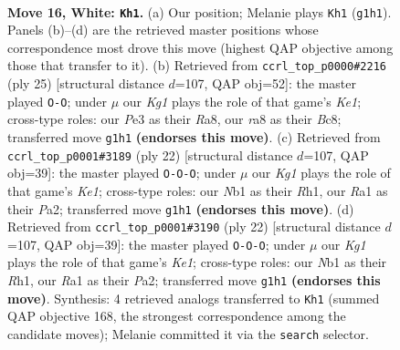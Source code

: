 \documentclass[11pt]{article}
\begin{document}
\clearpage

\begin{figure}[p]\centering
\begin{subfigure}{0.46\textwidth}\centering
\resizebox{\linewidth}{!}{%
\newchessgame
\chessboard[
  setfen={r1b2r1k/1p1n1p2/4pnp1/2b4p/p1N2B2/P3P1P1/1P3PBP/RN1R2K1 w - - 1 16},
  showmover=false,
  pgfstyle=straightmove, color=movearrow, markmove={g1-h1}
]}
\caption{}
\end{subfigure}\hfill
\begin{subfigure}{0.46\textwidth}\centering
\resizebox{\linewidth}{!}{%
\newchessgame
\chessboard[
  setfen={r1b1k2r/3n1pp1/pp2p2p/2bn4/P1N5/2P2N2/1P1BBPPP/R3K2R b KQkq - 1 13},
  showmover=false,
  pgfstyle=straightmove, color=movearrow, markmove={e8-g8}
]}
\caption{}
\end{subfigure}
\\[4pt]
\begin{subfigure}{0.46\textwidth}\centering
\resizebox{\linewidth}{!}{%
\newchessgame
\chessboard[
  setfen={rn5r/p3kppp/bp3n2/2pp4/3P4/1PN2NP1/P3PP1P/R3KB1R w KQ - 0 12},
  showmover=false,
  pgfstyle=straightmove, color=movearrow, markmove={e1-c1}
]}
\caption{}
\end{subfigure}\hfill
\begin{subfigure}{0.46\textwidth}\centering
\resizebox{\linewidth}{!}{%
\newchessgame
\chessboard[
  setfen={rn5r/p3kppp/bp3n2/2pp4/3P4/1PN2NP1/P3PP1P/R3KB1R w KQ - 0 12},
  showmover=false,
  pgfstyle=straightmove, color=movearrow, markmove={e1-c1}
]}
\caption{}
\end{subfigure}
\caption{\textbf{Move 16, White: \texttt{Kh1}.} (a) Our position; Melanie plays \texttt{Kh1} (\texttt{g1h1}). Panels (b)--(d) are the retrieved master positions whose correspondence most drove this move (highest QAP objective among those that transfer to it). (b) Retrieved from \texttt{ccrl\_top\_p0000\#2216} (ply 25) [structural distance $d$=107, QAP obj=52]: the master played \texttt{O-O}; under $\mu$ our \emph{Kg1} plays the role of that game's \emph{Ke1}; cross-type roles: our \emph{P}e3 as their \emph{R}a8, our \emph{r}a8 as their \emph{B}c8; transferred move \texttt{g1h1} \textbf{(endorses this move)}. (c) Retrieved from \texttt{ccrl\_top\_p0001\#3189} (ply 22) [structural distance $d$=107, QAP obj=39]: the master played \texttt{O-O-O}; under $\mu$ our \emph{Kg1} plays the role of that game's \emph{Ke1}; cross-type roles: our \emph{N}b1 as their \emph{R}h1, our \emph{R}a1 as their \emph{P}a2; transferred move \texttt{g1h1} \textbf{(endorses this move)}. (d) Retrieved from \texttt{ccrl\_top\_p0001\#3190} (ply 22) [structural distance $d$=107, QAP obj=39]: the master played \texttt{O-O-O}; under $\mu$ our \emph{Kg1} plays the role of that game's \emph{Ke1}; cross-type roles: our \emph{N}b1 as their \emph{R}h1, our \emph{R}a1 as their \emph{P}a2; transferred move \texttt{g1h1} \textbf{(endorses this move)}. Synthesis: 4 retrieved analogs transferred to \texttt{Kh1} (summed QAP objective 168, the strongest correspondence among the candidate moves); Melanie committed it via the \texttt{search} selector.}
\label{fig:thought-m30}
\end{figure}
\end{document}
